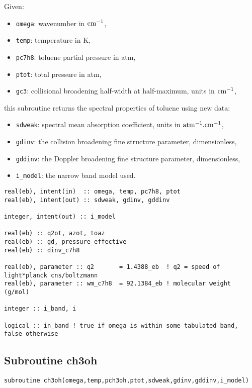 Given:
\begin{itemize}
 \item \verb=omega=: wavenumber in $\rm cm^{-1}$,
 \item \verb=temp=: temperature in K,
 \item \verb=pc7h8=: toluene partial pressure in atm,
 \item \verb=ptot=: total pressure in atm,
 \item \verb=gc3=: collisional broadening half-width at half-maximum, units in $\rm cm^{-1}$,
\end{itemize}
this subroutine returns the spectral properties of toluene using new data:
\begin{itemize}
 \item \verb=sdweak=: spectral mean absorption coefficient, units in $\rm atm^{-1}.cm^{-1}$,
 \item \verb=gdinv=: the collision broadening fine structure parameter, dimensionless,
 \item \verb=gddinv=: the Doppler broadening fine structure parameter, dimensionless,
 \item \verb=i_model=: the narrow band model used.
\end{itemize}

\begin{lstlisting}
real(eb), intent(in)  :: omega, temp, pc7h8, ptot
real(eb), intent(out) :: sdweak, gdinv, gddinv

integer, intent(out) :: i_model

real(eb) :: q2ot, azot, toaz
real(eb) :: gd, pressure_effective
real(eb) :: dinv_c7h8

real(eb), parameter :: q2       = 1.4388_eb  ! q2 = speed of light*planck cns/boltzmann
real(eb), parameter :: wm_c7h8  = 92.1384_eb ! molecular weight (g/mol)

integer :: i_band, i

logical :: in_band ! true if omega is within some tabulated band, false otherwise
\end{lstlisting}


\subsection{Subroutine ch3oh}
\label{sub:ch3oh}


\begin{lstlisting}
subroutine ch3oh(omega,temp,pch3oh,ptot,sdweak,gdinv,gddinv,i_model)
\end{lstlisting}

